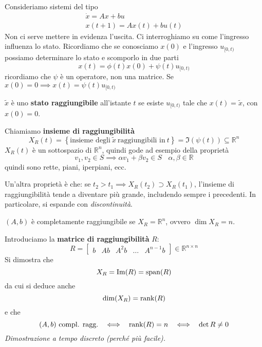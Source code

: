 Consideriamo sistemi del tipo
\begin{gather*}
	\dot{x} =Ax+bu\\
	x(t+1) =Ax(t) +bu(t)
\end{gather*}
Non ci serve mettere in evidenza l'uscita. Ci interroghiamo su come l'ingresso influenza lo stato. Ricordiamo che se conosciamo $x(0)$ e l'ingresso $u_{[ 0,t)}$ possiamo determinare lo stato e scomporlo in due parti
\begin{equation*}
	x(t) =\phi (t) x(0) +\psi (t) u_{[ 0,t)}
\end{equation*}
ricordiamo che $\psi $ è un operatore, non una matrice. Se $x(0) =0\implies x(t) =\psi (t) u_{[ 0,t)}$
\begin{defn}
	$\tilde{x}$ è uno \textbf{stato raggiungibile} all'istante $t$ se esiste $u_{[ 0,t)}$ tale che $x(t) =\tilde{x}$, con $x(0) =0$.
\end{defn}
Chiamiamo \textbf{insieme di raggiungibilità}
\begin{equation*}
	X_R(t) =\left\{\text{insieme degli} \ \tilde{x} \ \text{raggiungibili in} \ t\right\} =\Im(\psi (t)) \subseteq \mathbb{R}^n
\end{equation*}
$X_R(t)$ è un sottospazio di $\mathbb{R}^n$, quindi gode ad esempio della proprietà
\begin{equation*}
	v_1 ,v_2 \in S\implies \alpha v_1 +\beta v_2 \in S\ \ \ \ \alpha ,\beta \in \mathbb{R}
\end{equation*}
quindi sono rette, piani, iperpiani, ecc.

Un'altra proprietà è che: se $t_2  >t_1 \implies X_R(t_2) \supset X_R(t_1)$, l'insieme di raggiungibilità tende a diventare più grande, includendo sempre i precedenti. In particolare, si espande con \textit{discontinuità}.
\begin{defn}
	$(A,b)$ è completamente raggiungibile se $X_R =\mathbb{R}^n$, ovvero $\dim X_R =n$.
\end{defn}
Introduciamo la \textbf{matrice di raggiungibilità} $R$:
\begin{equation*}
	\boxed{
		R=\begin{bmatrix}
		b & Ab & A^2 b & \dotsc  & A^{n-1} b
		\end{bmatrix} \in \mathbb{R}^{n\times n}
	}
\end{equation*}
Si dimostra che
\begin{equation*}
	X_R =\operatorname{Im}(R) =\operatorname{span}(R)
\end{equation*}
da cui si deduce anche
\begin{equation*}
	\dim(X_R) =\operatorname*{rank}(R)
\end{equation*}
e che
\begin{equation*}
	(A,b) \ \text{compl. ragg.} \ \ \iff \ \ \rank(R) =n\ \ \iff \ \ \det R\neq 0
\end{equation*}
\textit{Dimostrazione a tempo discreto (perché più facile).}

